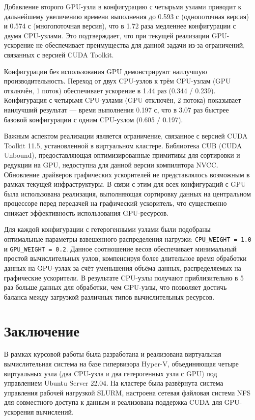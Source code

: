 \documentclass[areaset=advanced]{scrartcl}
\begin{document}
Добавление второго GPU-узла в конфигурацию с четырьмя узлами приводит к дальнейшему увеличению времени выполнения до 0.593 с (однопоточная версия) и 0.574 с (многопоточная версия), что в 1.72 раза медленнее конфигурации с двумя CPU-узлами. Это подтверждает, что при текущей реализации GPU-ускорение не обеспечивает преимущества для данной задачи из-за ограничений, связанных с версией CUDA Toolkit.

Конфигурации без использования GPU демонстрируют наилучшую производительность. Переход от двух CPU-узлов к трём CPU-узлам (GPU отключён, 1 поток) обеспечивает ускорение в 1.44 раз (0.344 / 0.239). Конфигурация с четырьмя CPU-узлами (GPU отключён, 2 потока) показывает наилучший результат — время выполнения 0.197 с, что в 3.07 раз быстрее базовой конфигурации с одним CPU-узлом (0.605 / 0.197).

Важным аспектом реализации является ограничение, связанное с версией CUDA Toolkit 11.5, установленной в виртуальном кластере. Библиотека CUB (CUDA Unbound), предоставляющая оптимизированные примитивы для сортировки и редукции на GPU, недоступна для данной версии компилятора NVCC. Обновление драйверов графических ускорителей не представлялось возможным в рамках текущей инфраструктуры. В связи с этим для всех конфигураций с GPU была использована реализация, выполняющая сортировку данных на центральном процессоре перед передачей на графический ускоритель, что существенно снижает эффективность использования GPU-ресурсов.

Для каждой конфигурации с гетерогенными узлами были подобраны оптимальные параметры взвешенного распределения нагрузки: \texttt{CPU\_WEIGHT = 1.0} и \texttt{GPU\_WEIGHT = 0.2}. Данное соотношение весов обеспечивает минимальный простой вычислительных узлов, компенсируя более длительное время обработки данных на GPU-узлах за счёт уменьшения объёма данных, распределяемых на графические ускорители. В результате CPU-узлы получают приблизительно в 5 раз больше данных для обработки, чем GPU-узлы, что позволяет достичь баланса между загрузкой различных типов вычислительных ресурсов.


\newpage
\section{Заключение}

В рамках курсовой работы была разработана и реализована виртуальная вычислительная система на базе гипервизора Hyper-V, объединяющая четыре виртуальных узла (два CPU-узла и два гетерогенных узла с GPU) под управлением Ubuntu Server 22.04. На кластере была развёрнута система управления рабочей нагрузкой SLURM, настроена сетевая файловая система NFS для совместного доступа к данным и реализована поддержка CUDA для GPU-ускорения вычислений.
\end{document}
